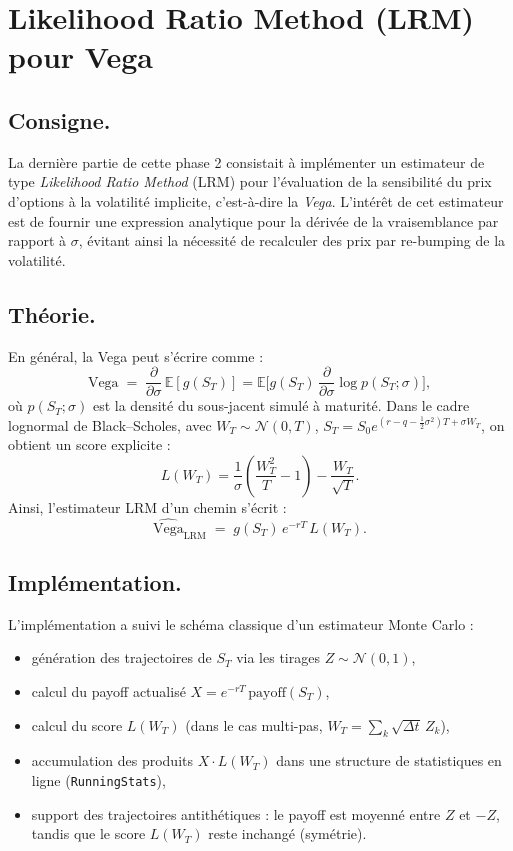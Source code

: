 \documentclass[a4paper,11pt]{article}
\begin{document}
\section{Likelihood Ratio Method (LRM) pour Vega}

\subsection*{Consigne.}  
La dernière partie de cette phase 2 consistait à implémenter un estimateur de type \emph{Likelihood Ratio Method} (LRM) pour l’évaluation de la sensibilité du prix d’options à la volatilité implicite, c’est-à-dire la \emph{Vega}.  
L’intérêt de cet estimateur est de fournir une expression analytique pour la dérivée de la vraisemblance par rapport à $\sigma$, évitant ainsi la nécessité de recalculer des prix par re-bumping de la volatilité.

\subsection*{Théorie.}  
En général, la Vega peut s’écrire comme :
\[
\text{Vega} \;=\; \frac{\partial}{\partial \sigma}\, \mathbb{E}[g(S_T)]
= \mathbb{E}\Big[ g(S_T)\, \frac{\partial}{\partial \sigma} \log p(S_T;\sigma) \Big],
\]
où $p(S_T;\sigma)$ est la densité du sous-jacent simulé à maturité.  
Dans le cadre lognormal de Black–Scholes, avec $W_T \sim \mathcal{N}(0,T)$, $S_T = S_0 e^{(r-q-\tfrac12\sigma^2)T + \sigma W_T}$, on obtient un score explicite :
\[
L(W_T) = \frac{1}{\sigma}\left( \frac{W_T^2}{T} - 1 \right) - \frac{W_T}{\sqrt{T}}.
\]
Ainsi, l’estimateur LRM d’un chemin s’écrit :
\[
\widehat{\text{Vega}}_{\text{LRM}} \;=\; g(S_T)\, e^{-rT}\, L(W_T).
\]

\subsection*{Implémentation.}  
L’implémentation a suivi le schéma classique d’un estimateur Monte Carlo :
\begin{itemize}
  \item génération des trajectoires de $S_T$ via les tirages $Z \sim \mathcal{N}(0,1)$,
  \item calcul du payoff actualisé $X = e^{-rT}\,\text{payoff}(S_T)$,
  \item calcul du score $L(W_T)$ (dans le cas multi-pas, $W_T = \sum_k \sqrt{\Delta t}\,Z_k$),
  \item accumulation des produits $X \cdot L(W_T)$ dans une structure de statistiques en ligne (\texttt{RunningStats}),
  \item support des trajectoires antithétiques : le payoff est moyenné entre $Z$ et $-Z$, tandis que le score $L(W_T)$ reste inchangé (symétrie).
\end{itemize}
\end{document}
